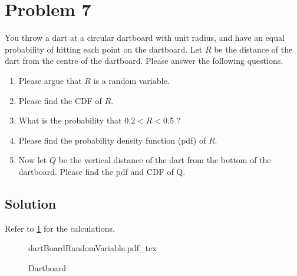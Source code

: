 \section{Problem 7}
You throw a dart at a circular dartboard with unit radius, and have an equal probability of hitting each point on the dartboard. Let $R$ be the distance of the dart from the centre of the dartboard. Please answer the following questions.

\begin{enumerate}[7a.]
	\item Please argue that $R$ is a random variable.
	\item Please find the CDF of $R$.
	\item What is the probability that $0.2<R<0.5$ ?
	\item Please find the probability density function (pdf) of $R$.
	\item Now let $Q$ be the vertical distance of the dart from the bottom of the dartboard. Please find the pdf and CDF of Q.
\end{enumerate}
\subsection{Solution}

Refer to \cref{fig:dartBoardRandomVariable} for the calculations.

\begin{figure}[H]
	\centering
	\begin{adjustbox}{max width=0.9\textwidth}
		{dartBoardRandomVariable.pdf_tex}
	\end{adjustbox}
	\caption{Dartboard}
	\label{fig:dartBoardRandomVariable}
\end{figure}

